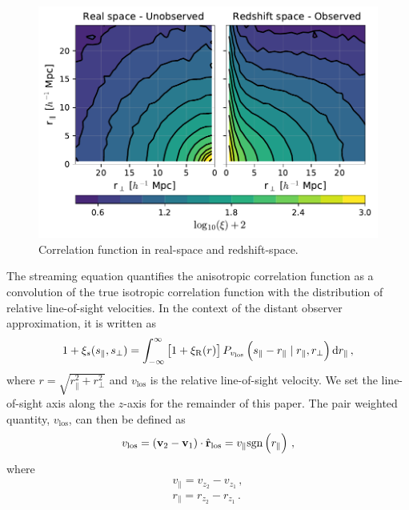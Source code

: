 \documentclass[a4paper,fleqn,usenatbib]{mnras}
\begin{document}
	\begin{figure}
		\centering
		\includegraphics[scale=0.57]{corr_mirror}
		\caption{Correlation function in real-space and redshift-space.}
		\label{fig:mi_corr}
	\end{figure}
	The streaming equation \citep{pe93,fi95, sc04} quantifies the anisotropic correlation function as a convolution of the true isotropic correlation function with the distribution of relative line-of-sight velocities. In the context of the distant observer approximation, it is written as 
	\begin{equation} \label{eq:old_streaming}
	\centering
	1 + \xi_s(s_{\parallel}, s_{\perp}) = \int_{-\infty}^{\infty}  \left[ 1 + \xi_{\mathrm{R}}(r) \right]
	P_{v_{\mathrm{los}}}\left(s_{\parallel} - r_{\parallel} \mid r_{\parallel}, r_{\perp}\right) \dif r_{\parallel} \, ,
	\end{equation}
	where $r = \sqrt{r_{\parallel}^2 + r_{\perp}^2}$ and $v_{\mathrm{los}}$ is the relative line-of-sight velocity. We set the line-of-sight axis along the $z$-axis for the remainder of this paper. The pair weighted quantity, $v_{\mathrm{los}}$, can then be defined as
	\begin{eqnarray}\label{eq:rel_los}
	\centering
	v_{\mathrm{los}} = \left(\mathbf{v}{_2} - \mathbf{v}{_1}\right)\cdot \hat{\mathbf{r}}{_{\mathrm{los}}} = v_{\parallel} \mathrm{sgn}\left(r_{\parallel}\right) \, ,
	\end{eqnarray}
	\noindent where 
	\begin{eqnarray}
	v_{\parallel}= v_{z_2} - v_{z_1} \, , \\
	r_{\parallel}= r_{z_2} - r_{z_1}\, .
	\end{eqnarray}
	
\end{document}
